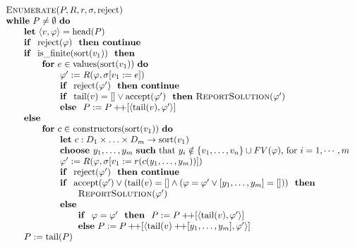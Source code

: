 \documentclass{article}
\newcommand{\concat}{\ensuremath{+\!\!+}}
\begin{document}
\[
\begin{tabular}{l}
\textsc{Enumerate}($P,R,r,\sigma, \mathrm{reject})$ \\
\textbf{while} $P\neq \emptyset $ \textbf{do} \\
\qquad \textbf{let} $\left\langle v,\varphi \right\rangle =\mathrm{head}(P)$ \\
\qquad \textbf{if } $\mathrm{reject}(\varphi)$ \textbf{ then continue} \\
\qquad \textbf{if } $\mathrm{is\_finite}(\mathrm{sort}(v_{1}))$ \textbf{ then} \\
\qquad \qquad \textbf{for} $e\in \mathrm{values}(\mathrm{sort}(v_{1}))$ \textbf{do} \\
\qquad \qquad \qquad $\varphi^{\prime}:=R(\varphi,\sigma[v_{1}:=e])$ \\
\qquad \qquad \qquad \textbf{if } $\mathrm{reject}(\varphi')$ \textbf{ then continue} \\
\qquad \qquad \qquad \textbf{if } $\mathrm{tail}(v) = [] \vee \mathrm{accept}(\varphi')$ \textbf{ then} \textsc{ReportSolution}($\varphi'$) \\
\qquad \qquad \qquad \textbf{else } $P:=P\concat\lbrack \left\langle \mathrm{tail}(v), \varphi' \right\rangle ]$ \\
\qquad \textbf{else } \\
\qquad \qquad \textbf{for} $c\in $ $\mathrm{constructors}(\mathrm{sort}(v_{1}))$ \textbf{do} \\
\qquad \qquad \qquad \textbf{let} $c:D_{1}\times \ldots \times
D_{m}\rightarrow \mathrm{sort}(v_{1})$ \\
\qquad \qquad \qquad \textbf{choose }$y_1,\ldots ,y_m$
\textbf{such} that $y_i \notin \{ v_1, \ldots ,v_n \} \cup FV(\varphi)$, for $i=1, \cdots, m$ \\
\qquad \qquad \qquad $\varphi ^{\prime }:=R(\varphi ,\sigma \lbrack v_{1}:=r(c(y_{1},\ldots ,y_{m}))])$ \\
\qquad \qquad \qquad \textbf{if } $\mathrm{reject}(\varphi')$ \textbf{ then continue} \\
\qquad \qquad \qquad \textbf{if } $\mathrm{accept}(\varphi')
\vee (\mathrm{tail}(v) = [] \wedge (\varphi = \varphi' \vee [y_1,\ldots ,y_m] = [])) 
$ \textbf{ then} \\
\qquad \qquad \qquad \qquad \textsc{ReportSolution}($\varphi'$) \\
\qquad \qquad \qquad \textbf{else} \\
\qquad \qquad \qquad \qquad \textbf{if } $\varphi = \varphi'$ \textbf{ then }
$P:=P\concat\lbrack \left\langle \mathrm{tail}(v),\varphi'\right\rangle ]$ \\
\qquad \qquad \qquad \qquad \textbf{else}
$P:=P\concat\lbrack \left\langle \mathrm{tail}(v) \concat [y_{1},\ldots ,y_{m}],\varphi'\right\rangle ]$ \\
\qquad $P:=\mathrm{tail}(P)$
\end{tabular}
\]
\end{document}
